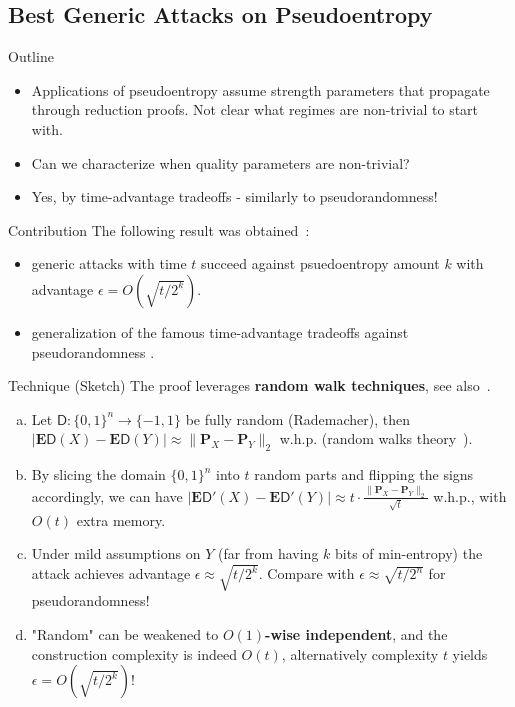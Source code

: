 \documentclass[9pt]{beamer}					%
\begin{document}


\subsection{Best Generic Attacks on Pseudoentropy }

\begin{frame}{Outline}
\begin{itemize}
\item[\emoji{open-book}] Applications of pseudoentropy assume strength parameters that propagate through reduction proofs. Not clear what regimes are non-trivial to start with.
\item[\emoji{question}] Can we characterize when quality parameters are non-trivial?
\item[\emoji{raised-hand}] Yes, by time-advantage tradeoffs - similarly to pseudorandomness!
\end{itemize}
\end{frame}

\begin{frame}{Contribution}
The following result was obtained~\cite{Skorski17a}:
\begin{itemize}
    \item[\emoji{key}] generic attacks with time $t$ succeed against psuedoentropy amount $k$ with advantage $\epsilon = O\left(\sqrt{t/2^{k}}\right)$.
    \item[\emoji{key}] generalization of the famous time-advantage tradeoffs against pseudorandomness \cite{DBLP:conf/crypto/DeTT10}.
\end{itemize}
\end{frame}

\begin{frame}{Technique (Sketch)}
\newcommand{\D}{\mathsf{D}}
The proof leverages \textbf{random walk techniques}, see also~\cite{berger_fourth_1997}.
\begin{enumerate}[(a)]
\item Let $\D:\{0,1\}^n\to \{-1,1\}$ be fully random (Rademacher), then $|\mathbf{E} \D(X)-\mathbf{E} \D(Y)| \approx \|\mathbf{P}_X-\mathbf{P}_Y\|_2$ w.h.p. (random walks theory~\cite{haagerup1981best}).
\item By slicing the domain $\{0,1\}^n$ into $t$ random parts and flipping the signs accordingly, we can have
$|\mathbf{E} \D'(X)-\mathbf{E} \D'(Y)| \approx t\cdot \frac{\|\mathbf{P}_X-\mathbf{P}_Y\|_2}{\sqrt{t}}$ w.h.p., with $O(t)$ extra memory.
\item Under mild assumptions on $Y$ (far from having $k$ bits of min-entropy) the attack achieves advantage $\epsilon\approx \sqrt{t/2^k}$. Compare with $\epsilon\approx \sqrt{t/2^n}$ for pseudorandomness!
\item "Random" can be weakened to \textbf{$O(1)$-wise independent}, and the construction complexity is indeed $O(t)$, alternatively complexity $t$ yields $\epsilon=O(\sqrt{t/2^k})$!
\end{enumerate}   
\end{frame}
\end{document}
